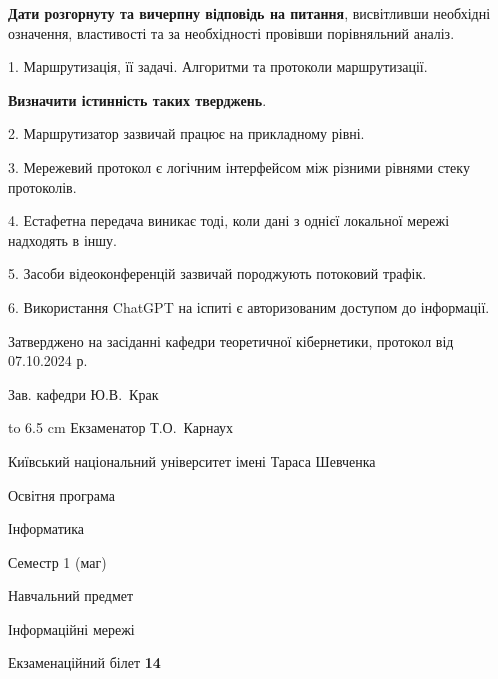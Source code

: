\documentclass[12pt, ukrainian]{article}
\begin{document}
{
\qquad\textbf{Дати розгорнуту та вичерпну відповідь на питання}, висвітливши необхідні означення, властивості та за необхідності провівши порівняльний аналіз.

1. Маршрутизація, її задачі. Алгоритми та протоколи маршрутизації.



\qquad\textbf{Визначити істинність таких тверджень}.

2. Маршрутизатор зазвичай працює на прикладному рівні.


3. Мережевий протокол є логічним інтерфейсом між різними рівнями стеку протоколів.


4. Естафетна передача виникає тоді, коли дані з однієї локальної мережі надходять в іншу.


5. Засоби відеоконференцій зазвичай породжують потоковий трафік.


6. Використання ChatGPT на іспиті є авторизованим доступом до інформації.

}
{\smallskip\smallskip \begin {scriptsize} Затверджено на засіданні кафедри теоретичної кібернетики, протокол   від   07.10.2024 р.\par\smallskip\smallskip\smallskip\smallskip
{\parbox {6.5 cm} {Зав. кафедри \dotfill Ю.В.~Крак}}\hspace {0.7cm} {\hbox to 6.5 cm { Екзаменатор \dotfill Т.О.~Карнаух}} \end{scriptsize}}
\vspace{0.9cm}
{{\begin {scriptsize}\par
{ \center  Київський національний університет імені Тараса Шевченка \par}
{\parbox {5 cm}{Освітня програма \hfill}{\parbox {7 cm}{Інформатика\hfill}}\parbox {6 cm}{\hfill Семестр 1 (маг)}}\par
{\parbox {5 cm} {Навчальний предмет \hfill}\parbox {7 cm}{Інформаційні мережі \hfill}\parbox {6cm}{\hfill}\par}\vspace{-15pt} \end{scriptsize}}{\center Екзаменаційний білет \No \textbf { 14 }\par}}
\end{document}
